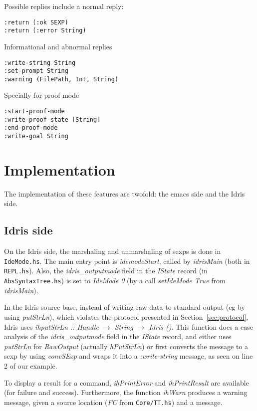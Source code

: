 \documentclass{article}
\begin{document}
Possible replies include a normal reply:
\begin{verbatim}
:return (:ok SEXP)
:return (:error String)
\end{verbatim}

Informational and abnormal replies
\begin{verbatim}
:write-string String
:set-prompt String
:warning (FilePath, Int, String)
\end{verbatim}

Specially for proof mode
\begin{verbatim}
:start-proof-mode
:write-proof-state [String]
:end-proof-mode
:write-goal String
\end{verbatim}

\section{Implementation}
The implementation of these features are twofold: the emacs side and the Idris side.

\subsection{Idris side}
On the Idris side, the marshaling and unmarshaling of sexps is done in \texttt{IdeMode.hs}.
The main entry point is \emph{idemodeStart}, called by \emph{idrisMain} (both in \texttt{REPL.hs}).
Also, the \emph{idris\_outputmode} field in the \emph{IState} record (in \texttt{AbsSyntaxTree.hs}) is set to \emph{IdeMode 0} (by a call \emph{setIdeMode True} from \emph{idrisMain}).

In the Idris source base, instead of writing raw data to standard output (eg by using \emph{putStrLn}), which violates the protocol presented in Section~\ref{sec:protocol}, Idris uses \emph{ihputStrLn :: Handle $\rightarrow$ String $\rightarrow$ Idris ()}.
This function does a case analysis of the \emph{idris\_outputmode} field in the \emph{IState} record, and either uses \emph{putStrLn} for \emph{RawOutput} (actually \emph{hPutStrLn}) or first converts the message to a sexp by using \emph{convSExp} and wraps it into a \emph{:write-string} message, as seen on line 2 of our example.

To display a result for a command, \emph{ihPrintError} and \emph{ihPrintResult} are available (for failure and success).
Furthermore, the function \emph{ihWarn} produces a warning message, given a source location (\emph{FC} from \texttt{Core/TT.hs}) and a message.
\end{document}
